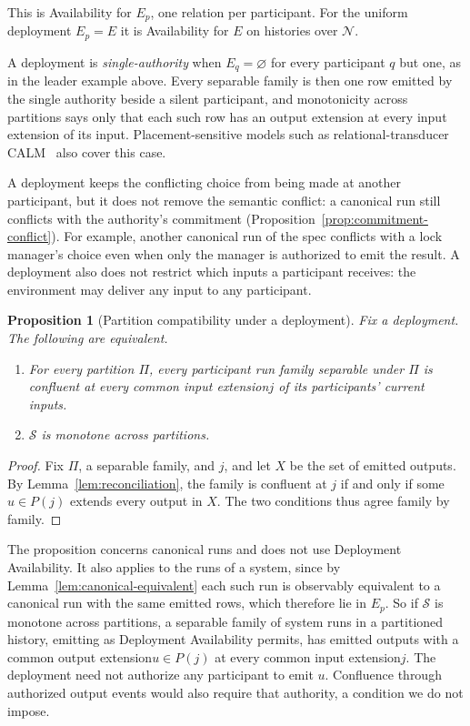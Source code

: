 \documentclass[sigconf]{cidr-2027}
\newtheorem{proposition}{Proposition}
\theoremstyle{remark}
\newcommand{\commitment}{commitment\xspace}
\newcommand{\indesc}{input extension\xspace} %
\newcommand{\outrel}{extends\xspace}          %
\newcommand{\outnoun}{output extension\xspace}%
\newcommand{\Spec}{\mathcal{S}}
\newcommand{\fiber}[1]{P(#1)}
\begin{document}
This is Availability for $E_p$, one relation per participant. For the uniform
deployment $E_p=E$ it is Availability for $E$ on histories over $\mathcal N$.

A deployment is \emph{single-authority} when $E_q=\varnothing$ for every
participant $q$ but one, as in the leader example above. Every separable
family is then one row emitted by the single authority beside a silent
participant, and monotonicity across partitions says only that each such row
has an \outnoun at every \indesc of its input. Placement-sensitive models
such as relational-transducer CALM~\cite{ameloot2013relational,ameloot2015weaker}
also cover this case.

A deployment keeps the conflicting choice from being made at another
participant, but it does not remove the semantic conflict: a canonical run
still conflicts with the authority's \commitment
(Proposition~\ref{prop:commitment-conflict}). For example, another canonical
run of the spec conflicts with a lock manager's choice even when only the
manager is authorized to emit the result. A deployment also does not restrict
which inputs a participant receives: the environment may deliver any input to
any participant.

\begin{proposition}[Partition compatibility under a deployment]
\label{thm:complete-cap-deployment}
Fix a deployment. The following are equivalent.
\begin{enumerate}
\item
For every partition $\Pi$, every participant run family separable
        under $\Pi$ is confluent at every common \indesc $j$ of its
        participants' current inputs.
\item
$\Spec$ is monotone across partitions.
\end{enumerate}
\end{proposition}

\begin{proof}
Fix $\Pi$, a separable family, and $j$, and let $X$ be the set of emitted
outputs. By Lemma~\ref{lem:reconciliation}, the family is confluent at $j$ if
and only if some $u\in\fiber{j}$ \outrel every output in $X$. The two
conditions thus agree family by family.
\end{proof}

The proposition concerns canonical runs and does not use Deployment
Availability. It also applies to the runs of a system, since by
Lemma~\ref{lem:canonical-equivalent} each such run is observably equivalent to
a canonical run with the same emitted rows, which therefore lie in $E_p$. So
if $\Spec$ is monotone across partitions, a separable family of system runs in
a partitioned history, emitting as Deployment Availability permits, has
emitted outputs with a common \outnoun $u\in\fiber{j}$ at every common
\indesc $j$. The deployment need not authorize any participant to emit $u$. Confluence through authorized output events would also require that
authority, a condition we do not impose.
\end{document}
